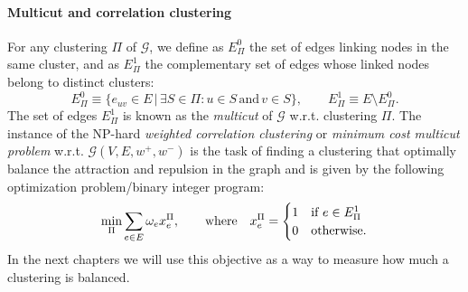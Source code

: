\paragraph{Multicut and correlation clustering} For any clustering $\Pi$ of $\mathcal{G}$, we define as $E^0_\Pi$ the set of edges linking nodes in the same cluster, and as $E_\Pi^1$ the complementary set of edges whose linked nodes belong to distinct clusters:
\begin{equation}
E_\Pi^0 \equiv \{ e_{uv} \in E \,|\, \exists S \in \Pi : u \in S \, \text{and} \, v \in S \}, \qquad E^1_\Pi \equiv E \setminus E^0_\Pi.
\end{equation}
The set of edges $E_\Pi^1$ is known as the \emph{multicut} of $\mathcal{G}$ w.r.t. clustering $\Pi$. The instance of the NP-hard \emph{weighted correlation clustering} or \emph{minimum cost multicut problem} w.r.t. $\mathcal{G}(V,E,w^+, w^-)$ \cite{kappes2011globally,chopra1991multiway,andres2015lifting} is the task of finding a clustering that optimally balance the attraction and repulsion in the graph and is given by the following optimization problem/binary integer program:
\begin{equation}
 \min_\Pi \sum_{e\in E} \omega_e x_e^\Pi,  \qquad \text{where} \quad x^\Pi_e = 
 \begin{cases} 
 1 & \text{if } e\in E^1_\Pi \\
 0 & \text{otherwise}.
 \end{cases}
\end{equation}
In the next chapters we will use this objective as a way to measure how much a clustering is balanced.

